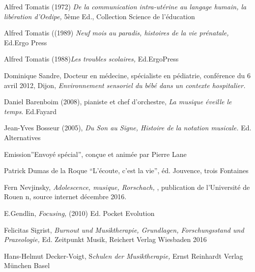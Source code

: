 \begin{thebibliography}{10}
Alfred Tomatis (1972) \emph{De la communication
intra-utérine au langage humain, la libération d'Oedipe,} 5ème Ed.,\emph{
}Collection Science de l'éducation

Alfred Tomatis ((1989) \emph{Neuf mois au paradis,
histoires de la vie prénatale,} Ed.Ergo Press

Alfred Tomatis (1988)\emph{Les troubles scolaires,}
Ed.ErgoPress

Dominique Sandre, Docteur en médecine, spécialiste
en pédiatrie, conférence du 6 avril 2012, Dijon, \emph{Environnement
sensoriel du bébé dans un contexte hospitalier.}

Daniel Barenboim (2008), pianiste et chef d'orchestre,
\emph{La musique éveille le temps}. Ed.Fayard

Jean-Yves Bosseur (2005), \emph{Du Son au Signe, Histoire
de la notation musicale. }Ed. Alternatives

Emission''Envoyé spécial'', conçue et animée par
Pierre Lane

Patrick Dumas de la Roque ``L'écoute, c'est la vie'',
éd. Jouvence, trois Fontaines 

Fern Nevjinsky,\emph{ Adolescence, musique, Rorschach,
}, publication de l'Université de Rouen n, source internet
décembre 2016.

E.Gendlin,\emph{ Focusing,} (2010) Ed. Pocket Evolution 

Felicitas Sigrist, \emph{Burnout und Musiktherapie,
Grundlagen, Forschungsstand und Praxeologie, }Ed. Zeitpunkt Musik,
Reichert Verlag Wiesbaden 2016

Hans-Helmut Decker-Voigt, S\emph{chulen der Musiktherapie,
}Ernst Reinhardt Verlag München Basel
\end{thebibliography}
